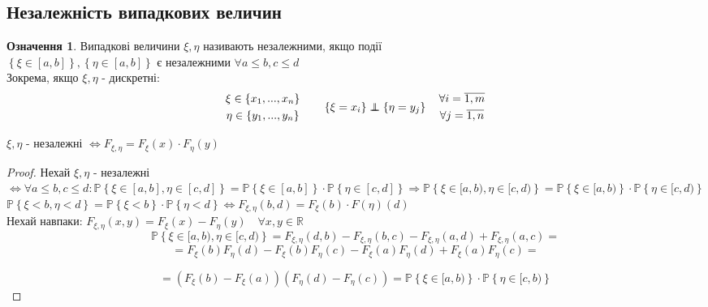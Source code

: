\documentclass[14pt,a4paper]{scrartcl}
\theoremstyle{definition}
\newtheorem*{defo}{Означення}
\theoremstyle{remark}
\theoremstyle{definition}
\theoremstyle{definition}
\newcommand\independent{\protect\mathpalette{\protect\independenT}{\perp}}
\def\independenT#1#2{\mathrel{\rlap{$#1#2$}\mkern2mu{#1#2}}}
\begin{document}
\subsection{Незалежність випадкових величин}
\begin{defo}
	Випадкові величини $\xi, \eta$ називають незалежними, якщо події \\$ \left\lbrace \xi\in [a,b] \right\rbrace, \left\lbrace \eta\in [a,b] \right\rbrace $ є незалежними $ \forall a \leq  b , c\leq d$\\
	Зокрема, якщо $\xi, \eta$ - дискретні:
	$$
	\begin{gathered}
	 \xi \in \left\lbrace x_1, ..., x_n \right\rbrace\\
	 \eta \in \left\lbrace y_1, ..., y_n  \right\rbrace
	\end{gathered} \qquad \left\lbrace \xi = x_i \right\rbrace \independent \left\lbrace \eta = y_j \right\rbrace \quad \begin{gathered}
	 \forall i = \overline{1, m}\\
	 \forall j = \overline{1, n}
	\end{gathered}
	$$

\end{defo}

\pagebreak

\begin{boxteo}
	$\xi, \eta$ - незалежні $\Leftrightarrow F_{\xi, \eta} = F_{\xi}(x) \cdot F_{\eta}(y)$
\end{boxteo}
\begin{proof}
Нехай $\xi, \eta$ - незалежні $\Leftrightarrow \forall a\leq b, c\leq d: \mathbb{P} \left\lbrace  \xi \in [a,b], \eta \in [c,d] \right\rbrace = \mathbb{P} \left\lbrace \xi\in[a,b] \right\rbrace \cdot \mathbb{P} \left\lbrace \eta\in[c,d] \right\rbrace \Rightarrow \mathbb{P} \left\lbrace  \xi\in [a,b), \eta \in [c,d) \right\rbrace = \mathbb{P} \left\lbrace \xi \in [a,b) \right\rbrace \cdot \mathbb{P} \left\lbrace \eta \in [c,d) \right\rbrace  $\\
$
\mathbb{P} \left\lbrace \xi<b, \eta <d  \right\rbrace = \mathbb{P} \left\lbrace \xi < b \right\rbrace \cdot \mathbb{P} \left\lbrace \eta <d \right\rbrace \Leftrightarrow F_{\xi, \eta} (b,d) = F_{\xi}(b) \cdot F(\eta)(d)
$\\
Нехай навпаки: $ F_{\xi, \eta } (x,y)  = F_{\xi}(x) - F_{\eta}(y)\quad \forall x,y \in \mathbb{R}$
$$
\mathbb{P} \left\lbrace  \xi\in [a,b), \eta \in [c,d)\right\rbrace = F_{\xi, \eta} (d,b) - F_{\xi,\eta}(b,c) - F_{\xi, \eta }(a,d) + F_{\xi, \eta}(a,c) =
$$
$$
= F_{\xi}(b) F_{\eta} (d) - F_{\xi}(b) F_{\eta}(c) - F_{\xi}(a) F_{\eta}(d) + F_{\xi}(a) F_{\eta}(c)  =$$


$$= \left( F_{\xi}(b) - F_{\xi}(a) \right) \left( F_{\eta}(d) - F_\eta (c) \right) = \mathbb{P} \left\lbrace \xi\in [a,b) \right\rbrace \cdot \mathbb{P} \left\lbrace \eta \in [c,b) \right\rbrace
$$

\end{proof}

\end{document}
